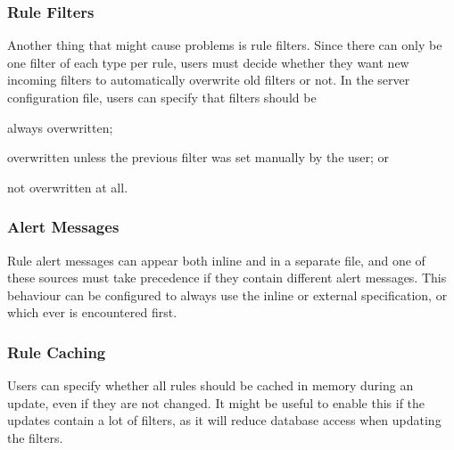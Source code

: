 \subsubsection{Rule Filters}
Another thing that might cause problems is rule filters. Since there can
only be one filter of each type per rule, users must decide whether they want
new incoming filters to automatically overwrite old filters or not. In the
server configuration file, users can specify that filters should be
\begin{inparaenum}
\item always overwritten; \item overwritten unless the previous filter was
set manually by the user; or
\item not overwritten at all.
\end{inparaenum}

\subsubsection{Alert Messages}
Rule alert messages can appear both inline and in a separate file, and one of
these sources must take precedence if they contain different alert messages.
This behaviour can be configured to always use the inline or external
specification, or which ever is encountered first.

\subsubsection{Rule Caching}
Users can specify whether all rules should be cached in memory during an update,
even if they are not changed. It might be useful to enable this if the updates
contain a lot of filters, as it will reduce database access when updating the
filters.

